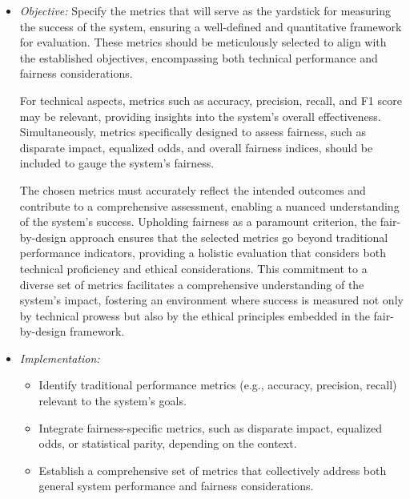 \documentclass[12pt,a4paper,openright,twoside]{book}
\begin{document}
\begin{itemize}

    \item \emph{Objective:} Specify the metrics that will serve as the yardstick for measuring the success of the system, ensuring a well-defined and quantitative framework for evaluation. These metrics should be meticulously selected to align with the established objectives, encompassing both technical performance and fairness considerations.

    For technical aspects, metrics such as accuracy, precision, recall, and F1 score may be relevant, providing insights into the system's overall effectiveness. Simultaneously, metrics specifically designed to assess fairness, such as disparate impact, equalized odds, and overall fairness indices, should be included to gauge the system's fairness.
    
    The chosen metrics must accurately reflect the intended outcomes and contribute to a comprehensive assessment, enabling a nuanced understanding of the system's success. Upholding fairness as a paramount criterion, the fair-by-design approach ensures that the selected metrics go beyond traditional performance indicators, providing a holistic evaluation that considers both technical proficiency and ethical considerations. This commitment to a diverse set of metrics facilitates a comprehensive understanding of the system's impact, fostering an environment where success is measured not only by technical prowess but also by the ethical principles embedded in the fair-by-design framework.    
    
    \item \emph{Implementation:}
        
    \begin{itemize}
            
        \item Identify traditional performance metrics (e.g., accuracy, precision, recall) relevant to the system's goals.
            
        \item Integrate fairness-specific metrics, such as disparate impact, equalized odds, or statistical parity, depending on the context.
            
        \item Establish a comprehensive set of metrics that collectively address both general system performance and fairness considerations.

    \end{itemize}

\end{itemize}
\end{document}
